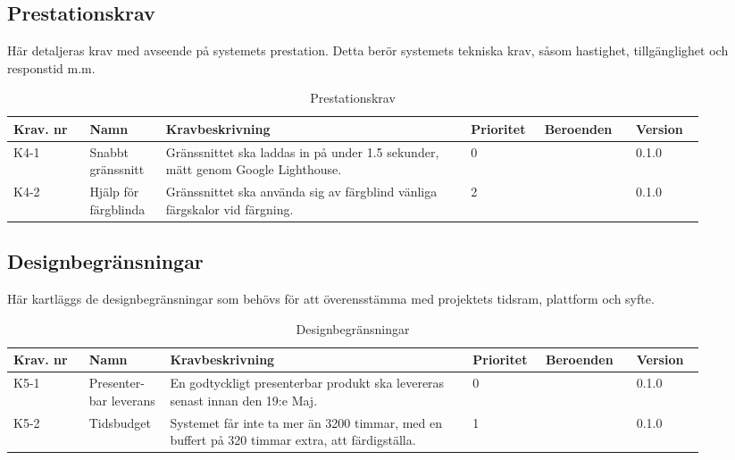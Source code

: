 \documentclass{article}
\begin{document}
\subsection{Prestationskrav}
Här detaljeras krav med avseende på systemets prestation. Detta berör systemets tekniska krav, såsom hastighet, tillgänglighet och responstid m.m. 

\begin{table}[H]

    \caption{Prestationskrav}
    \label{tab:placeholder_label}
    \centering
    \begin{tabular}{|p{0.1\linewidth}|p{0.1\linewidth}|p{0.4\linewidth}|p{0.09\linewidth}|p{0.12\linewidth}|p{0.09\linewidth}|}
        \hline
        \textbf{Krav. nr} & \textbf{Namn} & \textbf{Kravbeskrivning} & \textbf{Prioritet} & \textbf{Beroenden}  & \textbf{Version} \\ \hline
        K4-1 & Snabbt gränssnitt & Gränssnittet ska laddas in på under 1.5 sekunder, mätt genom Google Lighthouse.  & 0 & & 0.1.0\\ \hline
        K4-2 & Hjälp för färgblinda & Gränssnittet ska använda sig av färgblind vänliga färgskalor vid färgning. & 2 & & 0.1.0\\ \hline
    \end{tabular}
\end{table}

\subsection{Designbegränsningar}
Här kartläggs de designbegränsningar som behövs för att överensstämma med projektets tidsram, plattform och syfte. 

\begin{table}[H]

    \caption{Designbegränsningar}
    \label{tab:placeholder_label}
    \centering
    \begin{tabular}{|p{0.1\linewidth}|p{0.1\linewidth}|p{0.4\linewidth}|p{0.09\linewidth}|p{0.12\linewidth}|p{0.09\linewidth}|}
        \hline
        \textbf{Krav. nr} & \textbf{Namn} & \textbf{Kravbeskrivning} & \textbf{Prioritet} & \textbf{Beroenden}  & \textbf{Version} \\ \hline
        K5-1 & Presenter-bar leverans & En godtyckligt presenterbar produkt ska levereras senast innan den 19:e Maj. & 0 & & 0.1.0\\ \hline
        K5-2 & Tidsbudget & Systemet får inte ta mer än 3200 timmar, med en buffert på 320 timmar extra, att färdigställa. & 1 & & 0.1.0\\ \hline
    \end{tabular}
\end{table}
\end{document}
